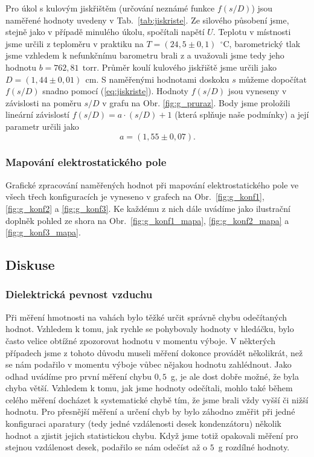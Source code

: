 \documentclass[english]{article}
\newcommand{\unit}[1]{\ \mathrm{#1}}
\begin{document}
						Pro úkol s kulovým jiskřištěm (určování neznámé funkce $f(s/D)$) jsou naměřené hodnoty uvedeny v Tab.~\ref{tab:jiskriste}. Ze silového působení jsme, stejně jako v případě minulého úkolu, spočítali napětí $U$. Teplotu v místnosti jsme určili z teploměru v praktiku na $T=(24,5\pm0,1)~\unit{^\circ C}$, barometrický tlak jsme vzhledem k nefunkčnímu barometru brali z \cite{bib:tlak} a uvažovali jsme tedy jeho hodnotu $b=762,81~\unit{torr}$. Průměr koulí kulového jiskřiště jsme určili jako $D=(1,44\pm0,01)~\unit{cm}$. S naměřenými hodnotami doskoku $s$ můžeme dopočítat $f(s/D)$ snadno pomocí (\ref{eq:jiskriste}). Hodnoty $f(s/D)$ jsou vyneseny v závislosti na poměru $s/D$ v grafu na Obr. \ref{fig:g_pruraz}. Body jsme proložili lineární závislostí $f(s/D) = a\cdot(s/D)+1$ (která splňuje naše podmínky) a její parametr určili jako
						\begin{equation}
								a = (1,55\pm0,07).
						\end{equation}
						
				\subsubsection{Mapování elektrostatického pole}
						Grafické zpracování naměřených hodnot při mapování elektrostatického pole ve všech třech konfiguracích je vyneseno v grafech na Obr.~\ref{fig:g_konf1}, \ref{fig:g_konf2} a \ref{fig:g_konf3}. Ke každému z nich dále uvádíme jako ilustrační doplněk pohled ze shora na Obr.~\ref{fig:g_konf1_mapa}, \ref{fig:g_konf2_mapa} a \ref{fig:g_konf3_mapa}.

  					
	\subsection{Diskuse}
			\subsubsection{Dielektrická pevnost vzduchu}
					Při měření hmotnosti na vahách bylo těžké určit správně chybu odečítaných hodnot. Vzhledem k tomu, jak rychle se pohybovaly hodnoty v hledáčku, bylo často velice obtížné zpozorovat hodnotu v momentu výboje. V některých případech jsme z tohoto důvodu museli měření dokonce provádět několikrát, než se nám podařilo v momentu výboje vůbec nějakou hodnotu zahlédnout. Jako odhad uvádíme pro první měření chybu $0,5$~g, je ale dost dobře možné, že byla chyba větší. Vzhledem k tomu, jak jsme hodnoty odečítali, mohlo také během celého měření docházet k systematické chybě tím, že jsme brali vždy vyšší či nižší hodnotu. Pro přesnější měření a určení chyb by bylo záhodno změřit při jedné konfiguraci aparatury (tedy jedné vzdálenosti desek kondenzátoru) několik hodnot a zjistit jejich statistickou chybu. Když jsme totiž opakovali měření pro stejnou vzdálenost desek, podařilo se nám odečíst až o $5$~g rozdílné hodnoty. 
			
\end{document}
